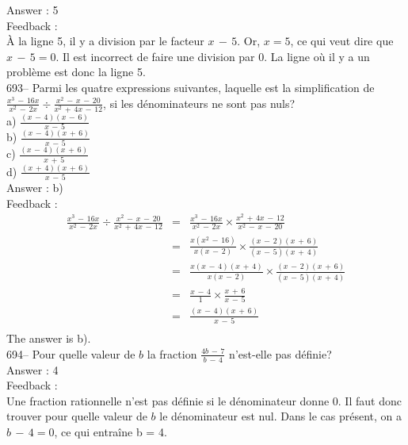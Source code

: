 \documentclass[letterpaper, 12pt]{article}
\begin{document}
Answer : 5\\

Feedback : \\
\`A la ligne 5, il y a division par le facteur $x\,-\,5$.  Or, $x=5$, ce qui
veut dire que $x\,-\,5=0$.  Il est incorrect de faire une division par 0.
La ligne o\`u il y a un probl\`eme est donc la ligne 5.\\

693-- Parmi les quatre expressions suivantes, laquelle est la simplification
de $\frac{x^{3}\,-\,16x}{x^{2}\,-\,2x}\div
\frac{x^{2}\,-\,x\,-\,20}{x^{2}\,+\,4x\,-\,12}$, si les d\'enominateurs ne
sont pas nuls?\\
a) $\frac{(x\,-\,4)(x\,-\,6)}{x\,-\,5}$\\[2mm]
b) $\frac{(x\,-\,4)(x\,+\,6)}{x\,-\,5}$\\[2mm]
c) $\frac{(x\,-\,4)(x\,+\,6)}{x\,+\,5}$\\[2mm]
d) $\frac{(x\,+\,4)(x\,+\,6)}{x\,-\,5}$\\

Answer : b)\\

Feedback : \\
\begin{eqnarray*}
\frac{x^{3}\,-\,16x}{x^{2}\,-\,2x}\div
\frac{x^{2}\,-\,x\,-\,20}{x^{2}\,+\,4x\,-\,12}&=&\frac{x^{3}\,-\,16x}{x^{2}\,-\,2x}\times\frac{x^{2}\,+\,4x\,-\,12}{x^{2}\,-\,x\,-\,20}\\[2mm]
&=&\frac{x(x^{2}\,-\,16)}{x(x\,-\,2)}\times
\frac{(x\,-\,2)(x\,+\,6)}{(x\,-\,5)(x\,+\,4)}\\[2mm]
&=&\frac{x(x\,-\,4)(x\,+\,4)}{x(x\,-\,2)}\times\frac{(x\,-\,2)(x\,+\,6)}{(x\,-\,5)(x\,+\,4)}\\[2mm]
&=&\frac{x\,-\,4}{1}\times \frac{x\,+\,6}{x\,-\,5}\\[2mm]
&=&\frac{(x\,-\,4)(x\,+\,6)}{x\,-\,5}\\[2mm]
\end{eqnarray*}
The answer is b).\\

694-- Pour quelle valeur de $b$ la fraction $\frac{4b\,-\,7}{b\,-\,4}$
n'est-elle pas d\'efinie?\\

Answer : 4\\

Feedback : \\
Une fraction rationnelle n'est pas d\'efinie si le d\'enominateur donne 0.
Il faut donc trouver pour quelle valeur de $b$ le d\'enominateur est nul.
Dans le cas pr\'esent, on a $b\,-\,4=0$, ce qui entra\^ine b = 4.\\
\end{document}
